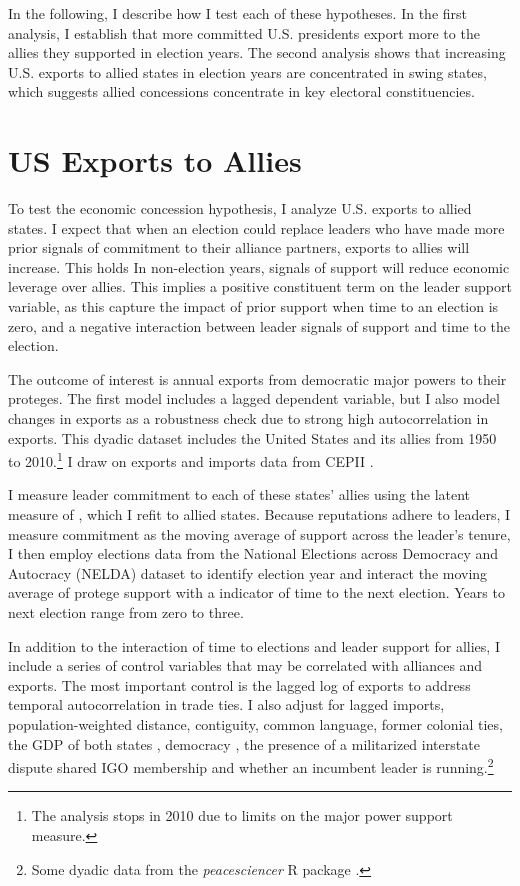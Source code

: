 \documentclass[12pt]{article}
\begin{document}
In the following, I describe how I test each of these hypotheses. 
In the first analysis, I establish that more committed U.S. presidents export more to the allies they supported in election years. 
The second analysis shows that increasing U.S. exports to allied states in election years are concentrated in swing states, which suggests allied concessions concentrate in key electoral constituencies.



\section{US Exports to Allies}

To test the economic concession hypothesis, I analyze U.S. exports to allied states. 
I expect that when an election could replace leaders who have made more prior signals of commitment to their alliance partners, exports to allies will increase. 
This holds 
In non-election years, signals of support will reduce economic leverage over allies.
This implies a positive constituent term on the leader support variable, as this capture the impact of prior support when time to an election is zero, and a negative interaction between leader signals of support and time to the election.


The outcome of interest is annual exports from democratic major powers to their proteges. 
The first model includes a lagged dependent variable, but I also model changes in exports as a robustness check due to strong high autocorrelation in exports.
This dyadic dataset includes the United States and its allies from 1950 to 2010.\footnote{The analysis stops in 2010 due to limits on the major power support measure.}
I draw on exports and imports data from CEPII \citep{FouquinHugot2016}.


I measure leader commitment to each of these states' allies using the latent measure of \citet{McManusNieman2019}, which I refit to allied states. 
Because reputations adhere to leaders, I measure commitment as the moving average of support across the leader's tenure, 
I then employ elections data from the National Elections across Democracy and Autocracy (NELDA) dataset \citep{HydeMarinov2012} to identify election year and interact the moving average of protege support with a indicator of time to the next election.
Years to next election range from zero to three. 


In addition to the interaction of time to elections and leader support for allies, I include a series of control variables that may be correlated with alliances and exports. 
The most important control is the lagged log of exports to address temporal autocorrelation in trade ties.
I also adjust for lagged imports, population-weighted distance, contiguity, common language, former colonial ties, the GDP of both states \citep{FouquinHugot2016}, democracy \citep{Marquez2016}, the presence of a militarized interstate dispute \citep{Gibleretal2016} shared IGO membership \citep{Pevehouseetal2020} and whether an incumbent leader is running.\footnote{Some dyadic data from the \textit{peacesciencer} \textsf{R} package \citep{peacesciencer-package}.}
\end{document}
